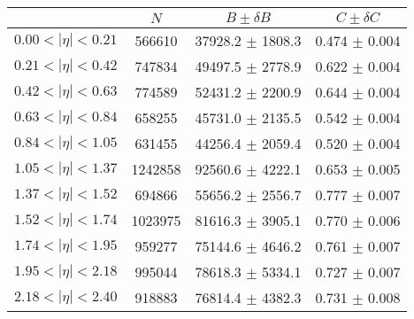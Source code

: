 \begin{tabular}{lccc}
\hline
    &   $N$   & $B \pm \delta B$  &  $C \pm \delta C$ \\
\hline
$0.00 < |\eta| <0.21$          & 566610     & 37928.2    $\pm$ 1808.3 & 0.474      $\pm$ 0.004 \\
$0.21 < |\eta| <0.42$          & 747834     & 49497.5    $\pm$ 2778.9 & 0.622      $\pm$ 0.004 \\
$0.42 < |\eta| <0.63$          & 774589     & 52431.2    $\pm$ 2200.9 & 0.644      $\pm$ 0.004 \\
$0.63 < |\eta| <0.84$          & 658255     & 45731.0    $\pm$ 2135.5 & 0.542      $\pm$ 0.004 \\
$0.84 < |\eta| <1.05$          & 631455     & 44256.4    $\pm$ 2059.4 & 0.520      $\pm$ 0.004 \\
$1.05 < |\eta| <1.37$          & 1242858    & 92560.6    $\pm$ 4222.1 & 0.653      $\pm$ 0.005 \\
$1.37 < |\eta| <1.52$          & 694866     & 55656.2    $\pm$ 2556.7 & 0.777      $\pm$ 0.007 \\
$1.52 < |\eta| <1.74$          & 1023975    & 81616.3    $\pm$ 3905.1 & 0.770      $\pm$ 0.006 \\
$1.74 < |\eta| <1.95$          & 959277     & 75144.6    $\pm$ 4646.2 & 0.761      $\pm$ 0.007 \\
$1.95 < |\eta| <2.18$          & 995044     & 78618.3    $\pm$ 5334.1 & 0.727      $\pm$ 0.007 \\
$2.18 < |\eta| <2.40$          & 918883     & 76814.4    $\pm$ 4382.3 & 0.731      $\pm$ 0.008 \\
\hline
\end{tabular}
